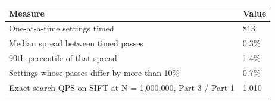 \begin{tabular}{ll}
\toprule
Measure & Value \\
\midrule
One-at-a-time settings timed & 813 \\
Median spread between timed passes & 0.3\% \\
90th percentile of that spread & 1.4\% \\
Settings whose passes differ by more than 10\% & 0.7\% \\
Exact-search QPS on SIFT at N = 1,000,000, Part 3 / Part 1 & 1.010 \\
\bottomrule
\end{tabular}
